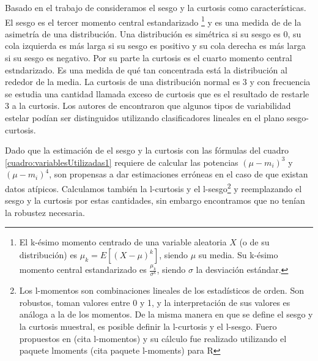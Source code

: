 \documentclass[letterpaper,12pt]{book}
\begin{document}
Basado en el trabajo de \cite{rodriguez_feliciano_alisis_2012} consideramos el sesgo y la curtosis como características. El sesgo es el tercer momento central estandarizado \footnote{El k-ésimo momento centrado de una variable aleatoria $X$ (o de su distribución) es $\mu_{k} =E[(X-\mu)^{k}]$, siendo $\mu$ su media. Su k-ésimo momento central estandarizado es $\frac{\mu_k}{\sigma^k}$, siendo $\sigma$ la desviación estándar.} y es una medida de de la asimetría de una distribución. Una distribución es simétrica si su sesgo es $0$, su cola izquierda es más larga si su sesgo es positivo y su cola derecha es más larga si su sesgo es negativo. Por su parte la curtosis es el cuarto momento central estndarizado. Es una medida de qué tan concentrada está la distribución al rededor de la media. La curtosis de una distribución normal es $3$ y con frecuencia se estudia una cantidad llamada exceso de curtosis que es el resultado de restarle $3$ a la curtosis. Los autores de \cite{rodriguez_feliciano_alisis_2012}  encontraron que algunos tipos de variabilidad estelar podían ser distinguidos utilizando clasificadores lineales en el plano sesgo-curtosis.

Dado que la estimación de el sesgo y la curtosis con las fórmulas del cuadro \ref{cuadro:variablesUtilizadas1} requiere de calcular las potencias $(\mu-m_i)^3$ y $(\mu-m_i)^4$, son propensas a dar estimaciones erróneas en el caso de que existan datos atípicos. Calculamos también la l-curtosis y el l-sesgo\footnote{Los l-momentos son combinaciones lineales de los estadísticos de orden. Son robustos, toman valores entre 0 y 1, y la interpretación de sus valores es análoga a la de los momentos. De la misma manera en que se define el sesgo y la curtosis muestral, es posible definir la l-curtosis y el l-sesgo. Fuero propuestos en (cita l-momentos) y su cálculo fue realizado utilizando el paquete lmoments (cita paquete l-moments) para R} y reemplazando el sesgo y la curtosis por estas cantidades, sin embargo encontramos que no tenían la robustez necesaria.   
\end{document}
